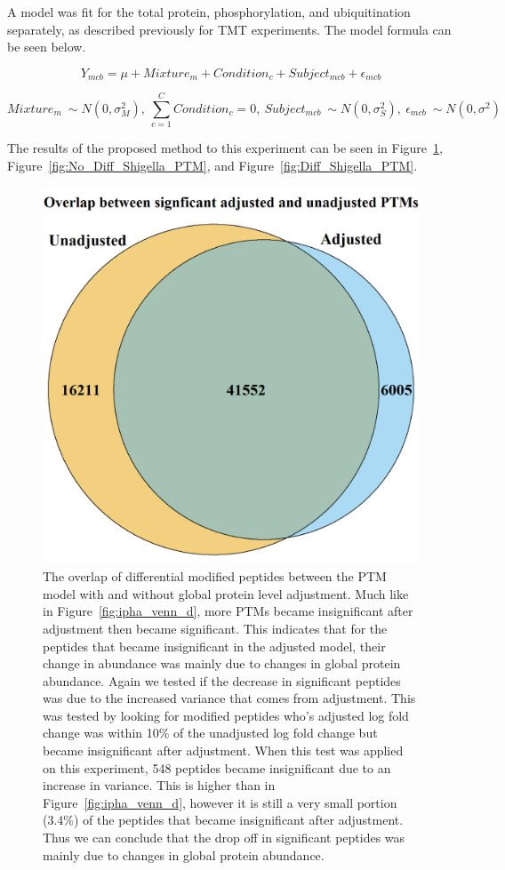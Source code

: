\documentclass{mcp}
\def\sfigref#1{{Figure~\ref{#1}}}
\begin{document}
A model was fit for the total protein, phosphorylation, and ubiquitination separately, as described previously for TMT experiments. The model formula can be seen below.

$$Y_{mcb} = \mu + Mixture_m + Condition_c + Subject_{mcb} + \epsilon_{mcb}$$

$$Mixture_m ~ \sim N(0, \sigma^2_M) ,\: \sum_{c=1}^C{Condition_c} = 0 ,\: Subject_{mcb} ~ \sim N(0, \sigma^2_S) ,\: \epsilon_{mcb} ~ \sim N(0, \sigma^2)$$

The results of the proposed method to this experiment can be seen in \sfigref{fig:shig_venn_d},  \sfigref{fig:No_Diff_Shigella_PTM}, and \sfigref{fig:Diff_Shigella_PTM}.

\begin{figure}[h!]
\centering
\includegraphics[height=.65\textwidth]{sim_new/shig_venn_diagramm.png}
\caption{The overlap of differential modified peptides between the PTM model with and without global protein level adjustment. Much like in \sfigref{fig:ipha_venn_d}, more PTMs became insignificant after adjustment then became significant. This indicates that for the peptides that became insignificant in the adjusted model, their change in abundance was mainly due to changes in global protein abundance. Again we tested if the decrease in significant peptides was due to the increased variance that comes from adjustment. This was tested by looking for modified peptides who's adjusted log fold change was within 10\% of the unadjusted log fold change but became insignificant after adjustment. When this test was applied on this experiment, 548 peptides became insignificant due to an increase in variance. This is higher than in \sfigref{fig:ipha_venn_d}, however it is still a very small portion (3.4\%) of the peptides that became insignificant after adjustment. Thus we can conclude that the drop off in significant peptides was mainly due to changes in global protein abundance.}
\label{fig:shig_venn_d}
\end{figure}
\end{document}
